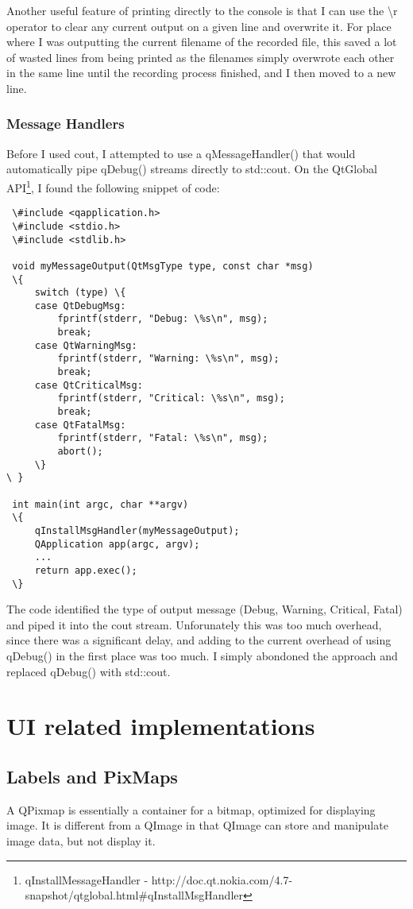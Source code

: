 Another useful feature of printing directly to the console is that I can use the \textbackslash r operator to clear any current output on a given line and overwrite it. For place where I was outputting the current filename of the recorded file, this saved a lot of wasted lines from being printed as the filenames simply overwrote each other in the same line until the recording process finished, and I then moved to a new line.

\subsubsection{Message Handlers}
Before I used cout, I attempted to use a qMessageHandler() that would automatically pipe qDebug() streams directly to std::cout. On the QtGlobal API\footnote{qInstallMessageHandler - http://doc.qt.nokia.com/4.7-snapshot/qtglobal.html\#qInstallMsgHandler}, I found the following snippet of code:
\begin{lstlisting}
 \#include <qapplication.h>
 \#include <stdio.h>
 \#include <stdlib.h>

 void myMessageOutput(QtMsgType type, const char *msg)
 \{
     switch (type) \{
     case QtDebugMsg:
         fprintf(stderr, "Debug: \%s\n", msg);
         break;
     case QtWarningMsg:
         fprintf(stderr, "Warning: \%s\n", msg);
         break;
     case QtCriticalMsg:
         fprintf(stderr, "Critical: \%s\n", msg);
         break;
     case QtFatalMsg:
         fprintf(stderr, "Fatal: \%s\n", msg);
         abort();
     \}
\ }

 int main(int argc, char **argv)
 \{
     qInstallMsgHandler(myMessageOutput);
     QApplication app(argc, argv);
     ...
     return app.exec();
 \}
\end{lstlisting}
The code identified the type of output message (Debug, Warning, Critical, Fatal) and piped it into the cout stream. Unforunately this was too much overhead, since there was a significant delay, and adding to the current overhead of using qDebug() in the first place was  too much. I simply abondoned the approach and replaced qDebug() with std::cout.

\section{UI related implementations}\label{widgetstuff}

\subsection{Labels and PixMaps}
A QPixmap is essentially a container for a bitmap, optimized for displaying image. It is different from a QImage in that QImage can store and manipulate image data, but not display it.

